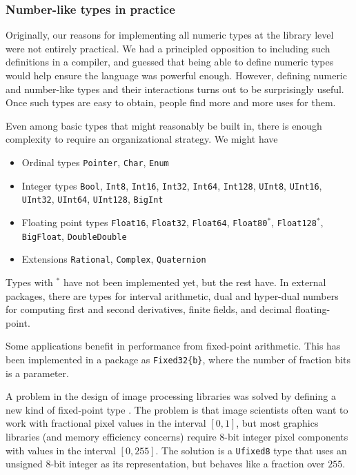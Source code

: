 \subsubsection{Number-like types in practice}

Originally, our reasons for implementing all numeric types at the library
level were not entirely practical.
We had a principled opposition to including such definitions in a compiler,
and guessed that being able to define numeric types would help ensure the
language was powerful enough.
However, defining numeric and number-like types and their interactions turns
out to be surprisingly useful.
Once such types are easy to obtain, people find more and more uses for them.

Even among basic types that might reasonably be built in, there is enough
complexity to require an organizational strategy.
We might have

\begin{itemize}
  \item Ordinal types \texttt{Pointer}, \texttt{Char}, \texttt{Enum}

  \item Integer types \texttt{Bool}, \texttt{Int8}, \texttt{Int16}, \texttt{Int32}, \texttt{Int64}, \texttt{Int128}, \texttt{UInt8}, \texttt{UInt16}, \texttt{UInt32}, \texttt{UInt64}, \texttt{UInt128}, \texttt{BigInt}

  \item Floating point types \texttt{Float16}, \texttt{Float32}, \texttt{Float64}, \texttt{Float80}$^*$, \texttt{Float128}$^*$, \texttt{BigFloat}, \texttt{DoubleDouble}

  \item Extensions \texttt{Rational}, \texttt{Complex}, \texttt{Quaternion}
\end{itemize}

\noindent
Types with $^*$ have not been implemented yet, but the rest have.
In external packages, there are types for interval arithmetic,
dual and hyper-dual numbers for computing first and second derivatives,
finite fields, and decimal floating-point.

Some applications benefit in performance from fixed-point arithmetic.
This has been implemented in a package as \texttt{Fixed32\{b\}}, where
the number of fraction bits is a parameter.

A problem in the design of image processing libraries was solved by
defining a new kind of fixed-point type \cite{ufixed}.
The problem is that image scientists often want to work with fractional
pixel values in the interval $[0,1]$, but most graphics libraries (and memory
efficiency concerns) require 8-bit integer pixel components with
values in the interval $[0,255]$.
The solution is a \texttt{Ufixed8} type that uses an unsigned 8-bit integer
as its representation, but behaves like a fraction over $255$.


